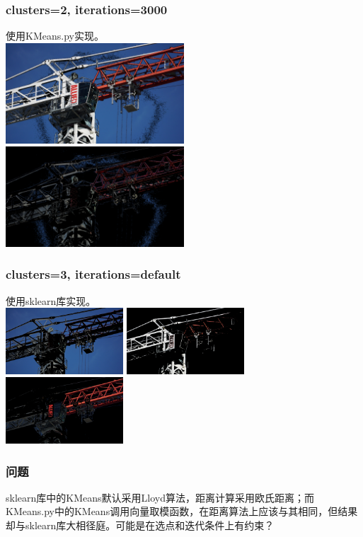\documentclass{article}
\begin{document}
\subsubsection{clusters=2, iterations=3000}
使用KMeans.py实现。\\
\includegraphics[width=0.5\textwidth]{src/it=3000_0.png}
\includegraphics[width=0.5\textwidth]{src/it=3000_1.png}\\
\subsubsection{clusters=3, iterations=default}
使用sklearn库实现。\\
\includegraphics[width=0.33\textwidth]{src/sklearn_0.png}
\includegraphics[width=0.33\textwidth]{src/sklearn_1.png}
\includegraphics[width=0.33\textwidth]{src/sklearn_2.png}\\
\subsubsection{问题}
sklearn库中的KMeans默认采用Lloyd算法，距离计算采用欧氏距离；而KMeans.py中的KMeans调用向量取模函数，在距离算法上应该与其相同，但结果却与sklearn库大相径庭。可能是在选点和迭代条件上有约束？
\end{document}
